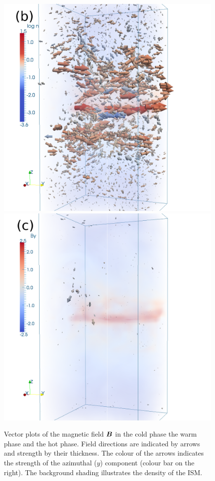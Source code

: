 \documentclass[useAMS,usenatbib]{mn2e}
\begin{document}
\begin{figure}
  \includegraphics[angle=0, trim=0.5cm 0cm 2cm 0cm, clip=true, totalheight=0.33\textheight]{fig/b310w.png}\hspace{-1.15cm}
  \includegraphics[angle=0, trim=0.5cm 0cm 2cm 0cm, clip=true, totalheight=0.33\textheight]{fig/b310h.png}
  \hspace{-4.5cm}
  \caption[Volume snapshots of $\vect{B}$ by phase for Model~$\Ompa$]{
  Vector plots of the magnetic field $\vect{B}$ {} in the cold phase
  {} the warm phase and {} the hot phase.
  Field directions are indicated by arrows and strength by their thickness.
  The colour of the arrows indicates the strength of the
  azimuthal ($y$) component (colour bar on the right).
  The background shading illustrates the density of the ISM.
  \label{fig:b3box}}
  \end{figure}
\end{document}
